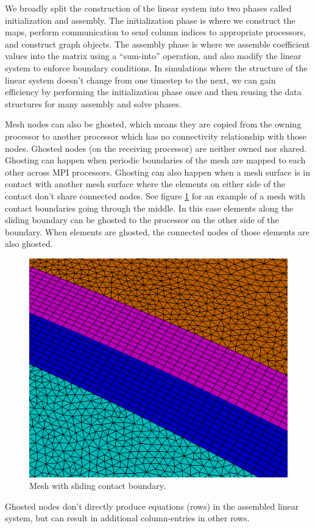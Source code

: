 We broadly split the construction of the linear system into two
phases called initialization and assembly. The initialization phase
is where we construct the maps, perform communication to send column
indices to appropriate processors, and construct graph objects.
The assembly phase is where we assemble coefficient values into the
matrix using a ``sum-into'' operation, and also modify the linear
system to enforce boundary conditions. In simulations where the structure
of the linear system doesn't change from one timestep to the next, we
can gain efficiency by performing the initialization phase once and
then reusing the data structures for many assembly and solve phases.

Mesh nodes can also be ghosted, which means they are copied from the owning
processor to another processor which has no connectivity relationship with
those nodes. Ghosted nodes (on the receiving processor) are neither owned
nor shared. Ghosting can happen when periodic boundaries of the mesh are mapped
to each other across MPI processors. Ghosting can also happen when a mesh
surface is in contact with another mesh surface where the elements on either
side of the contact don't share connected nodes. See figure \ref{slidingmesh1}
for an example of a mesh with contact boundaries going through the middle. In
this case elements along the sliding boundary can be ghosted to the processor
on the other side of the boundary. When elements are ghosted, the connected nodes
of those elements are also ghosted.

\begin{figure}[ht]
\centering
\includegraphics{figures/slidingMesh1.png}
\caption{Mesh with sliding contact boundary.}
\label{slidingmesh1}
\end{figure}

Ghosted nodes don't directly produce equations (rows) in the assembled linear system,
but can result in additional column-entries in other rows.

